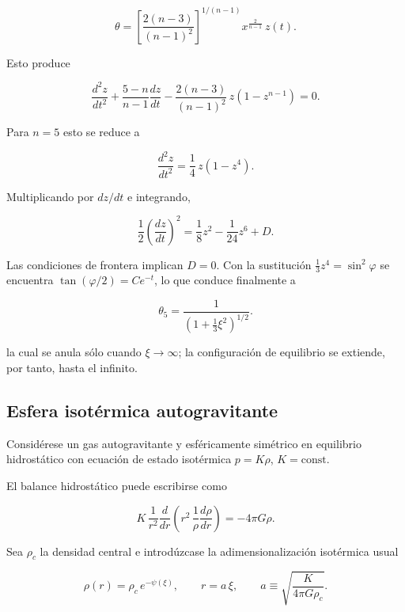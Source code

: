 $$ \theta = \left[\frac{2(n-3)}{(n-1)^2}\right]^{1/(n-1)} x^{\frac{2}{n-1}}\, z(t). $$

Esto produce

$$ \frac{d^2z}{dt^2} + \frac{5-n}{n-1}\frac{dz}{dt} - \frac{2(n-3)}{(n-1)^2}\,z\left(1 - z^{n-1}\right) = 0. $$

Para $n = 5$ esto se reduce a

$$ \frac{d^2z}{dt^2} = \frac{1}{4}\,z\left(1 - z^4\right). $$

Multiplicando por $dz/dt$ e integrando,

$$ \frac{1}{2}\left(\frac{dz}{dt}\right)^2 = \frac{1}{8}z^2 - \frac{1}{24}z^6 + D. $$

Las condiciones de frontera implican $D = 0$. Con la sustitución $\frac{1}{3}z^4 = \sin^2\varphi$ se encuentra $\tan(\varphi/2) = Ce^{-t}$, lo que conduce finalmente a

$$ \theta_5 = \frac{1}{\left(1 + \frac{1}{3}\xi^2\right)^{1/2}}. $$

la cual se anula sólo cuando $\xi \to \infty$; la configuración de equilibrio se extiende, por tanto, hasta el infinito.

\subsection{Esfera isotérmica autogravitante}

Considérese un gas autogravitante y esféricamente simétrico en equilibrio hidrostático con ecuación de estado isotérmica $p = K\rho$, $K = \mathrm{const}$.

El balance hidrostático puede escribirse como

$$ K\,\frac{1}{r^2}\frac{d}{dr}\left(r^2\,\frac{1}{\rho}\frac{d\rho}{dr}\right) = -4\pi G\rho. $$

Sea $\rho_c$ la densidad central e introdúzcase la adimensionalización isotérmica usual

$$ \rho(r) = \rho_c\, e^{-\psi(\xi)}, \qquad r = a\,\xi, \qquad a \equiv \sqrt{\frac{K}{4\pi G\rho_c}}. $$

